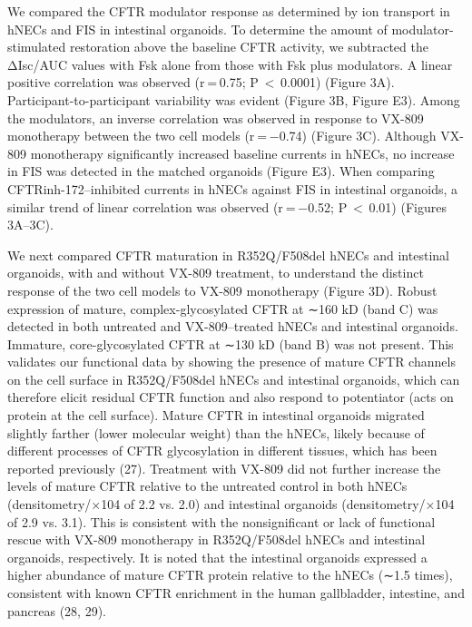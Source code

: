 We compared the CFTR modulator response as determined by ion transport in hNECs and FIS in intestinal organoids. To determine the amount of modulator-stimulated restoration above the baseline CFTR activity, we subtracted the ΔIsc/AUC values with Fsk alone from those with Fsk plus modulators. A linear positive correlation was observed (r = 0.75; P $<$ 0.0001) (Figure 3A). Participant-to-participant variability was evident (Figure 3B, Figure E3). Among the modulators, an inverse correlation was observed in response to VX-809 monotherapy between the two cell models (r = −0.74) (Figure 3C). Although VX-809 monotherapy significantly increased baseline currents in hNECs, no increase in FIS was detected in the matched organoids (Figure E3). When comparing CFTRinh-172–inhibited currents in hNECs against FIS in intestinal organoids, a similar trend of linear correlation was observed (r = −0.52; P $<$ 0.01) (Figures 3A–3C).


We next compared CFTR maturation in R352Q/F508del hNECs and intestinal organoids, with and without VX-809 treatment, to understand the distinct response of the two cell models to VX-809 monotherapy (Figure 3D). Robust expression of mature, complex-glycosylated CFTR at ∼160 kD (band C) was detected in both untreated and VX-809–treated hNECs and intestinal organoids. Immature, core-glycosylated CFTR at ∼130 kD (band B) was not present. This validates our functional data by showing the presence of mature CFTR channels on the cell surface in R352Q/F508del hNECs and intestinal organoids, which can therefore elicit residual CFTR function and also respond to potentiator (acts on protein at the cell surface). Mature CFTR in intestinal organoids migrated slightly farther (lower molecular weight) than the hNECs, likely because of different processes of CFTR glycosylation in different tissues, which has been reported previously (27). Treatment with VX-809 did not further increase the levels of mature CFTR relative to the untreated control in both hNECs (densitometry/×104 of 2.2 vs. 2.0) and intestinal organoids (densitometry/×104 of 2.9 vs. 3.1). This is consistent with the nonsignificant or lack of functional rescue with VX-809 monotherapy in R352Q/F508del hNECs and intestinal organoids, respectively. It is noted that the intestinal organoids expressed a higher abundance of mature CFTR protein relative to the hNECs (∼1.5 times), consistent with known CFTR enrichment in the human gallbladder, intestine, and pancreas (28, 29).

